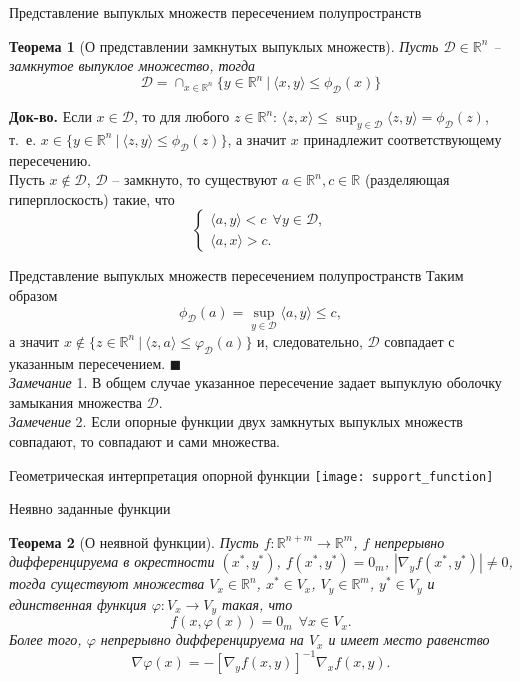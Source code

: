 \documentclass[10pt, handout]{beamer}
\newtheorem{theorem_ru}{Теорема}[]
\begin{document}
\begin{frame}{Представление выпуклых множеств пересечением полупространств}
\begin{theorem_ru}[О представлении замкнутых выпуклых множеств]
Пусть $\mathcal{D}\in \mathbb{R}^n$ -- замкнутое выпуклое множество, тогда 
$$
\mathcal{D}=\cap_{x\in \mathbb{R}^n}\{y\in \mathbb{R}^n~|~\langle x, y\rangle\leq \phi_\mathcal{D}(x)\}
$$
\end{theorem_ru}
\pause
\textbf{Док-во.} Если $x\in \mathcal{D}$, то для любого $z\in\mathbb{R}^n$: $\langle z, x\rangle\leq \sup_{y\in\mathcal{D}}\langle z, y\rangle=\phi_\mathcal{D}(z)$, т.~е. $x\in \{y\in \mathbb{R}^n~|~\langle z, y\rangle\leq \phi_\mathcal{D}(z)\}$, а значит $x$ принадлежит соответствующему пересечению.\\
\pause
Пусть $x\notin \mathcal{D}$, $\mathcal{D}$ -- замкнуто, то существуют $a\in \mathbb{R}^n, c\in \mathbb{R}$ (разделяющая гиперплоскость) такие, что
$$
\left\{\begin{array}{ll}
\langle a, y \rangle<c~~\forall y\in \mathcal{D},\\
\langle a, x \rangle>c.
\end{array}\right.
$$

\end{frame}

\begin{frame}{Представление выпуклых множеств пересечением полупространств}
Таким образом
$$
\phi_\mathcal{D}(a)=\sup_{y\in\mathcal{D}}\langle a, y\rangle\leq c,
$$
а значит $x\notin \{z\in \mathbb{R}^n~|~\langle z, a\rangle \leq \varphi_\mathcal{D}(a)\}$ и, следовательно, $\mathcal{D}$ совпадает с указанным пересечением. $\blacksquare$\\
\vspace{1em}
\pause
\textit{Замечание} 1. В общем случае указанное пересечение задает выпуклую оболочку замыкания множества $\mathcal{D}$.\\
\vspace{1em}
\pause
\textit{Замечение} 2. Если опорные функции двух замкнутых выпуклых множеств совпадают, то совпадают и сами множества.


\end{frame}

\begin{frame}{Геометрическая интерпретация опорной функции}
\centering
\texttt{[image: support\_function]}
\end{frame}

\begin{frame}{Неявно заданные функции}
\begin{theorem_ru}[О неявной функции]
Пусть $f:\mathbb{R}^{n+m}\rightarrow \mathbb{R}^m$, $f$ непрерывно дифференцируема в окрестности $(x^*, y^*)$, $f(x^*, y^*)=0_m$, $|\nabla_y f(x^*, y^*)|\neq 0$, тогда существуют множества $V_x\in \mathbb{R}^n$, $x^*\in V_x$, $V_y\in \mathbb{R}^m$, $y^*\in V_y$ и единственная функция $\varphi:V_x\rightarrow V_y$ такая, что
$$
f(x, \varphi(x))=0_m~~\forall x\in V_x.
$$
Более того, $\varphi$ непрерывно дифференцируема на $V_x$ и имеет место равенство
$$
\nabla \varphi(x)=-[\nabla_y f(x, y)]^{-1}\nabla_x f(x, y).
$$ 
\end{theorem_ru}
\end{frame}
\end{document}
